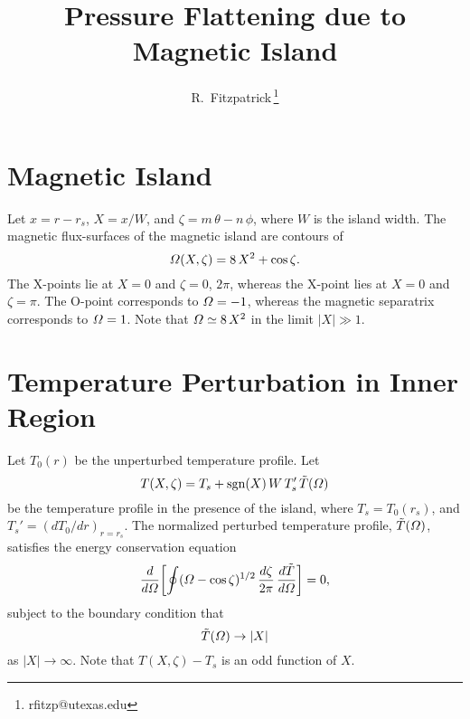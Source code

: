 \documentclass[12pt,prb,aps,notitlepage]{revtex4-1}
\begin{document}
\title{Pressure Flattening due to Magnetic Island}
\author{R.~Fitzpatrick\,\footnote{rfitzp@utexas.edu}}
\begin{abstract}
\end{abstract}
\maketitle

\section{Magnetic Island}
Let $x=r-r_s$, $X=x/W$, and $\zeta= m\,\theta-n\,\phi$, where $W$ is the island width. The magnetic flux-surfaces of the magnetic island are contours of
\begin{equation}
{\mit\Omega}(X,\zeta) = 8\,X^2 + \cos\zeta.
\end{equation}
The X-points lie at $X=0$ and $\zeta = 0$, $2\pi$, whereas the X-point lies at
$X=0$ and $\zeta=\pi$. The O-point corresponds to ${\mit\Omega}=-1$, whereas the magnetic separatrix corresponds to ${\mit\Omega}=1$.  Note that ${\mit\Omega}\simeq
8\,X^2$ in the limit $|X|\gg 1$. 

\section{Temperature Perturbation in Inner Region}
Let $T_0(r)$ be the unperturbed temperature profile. Let 
\begin{equation}\label{e2}
T(X,\zeta) = T_s + {\rm sgn}(X)\,W\,T_s'\,\tilde{T}({\mit\Omega})
\end{equation}
 be the temperature profile in the presence of the island,
where $T_s=T_0(r_s)$, and  $T_s'=(dT_0/dr)_{r=r_s}$. 
The normalized perturbed temperature profile, $\tilde{T}({\mit\Omega})$,  satisfies the energy conservation equation
\begin{equation}\label{e3}
\frac{d}{d{\mit\Omega}}\!\left[\oint({\mit\Omega}-\cos\zeta)^{1/2}\,\frac{d\zeta}{2\pi}\,\frac{d\tilde{T}}{d
{\mit\Omega}} \right]= 0,
\end{equation}
subject to the boundary condition that
\begin{equation}\label{e4}
\tilde{T}({\mit\Omega}) \rightarrow |X|
\end{equation}
as $|X|\rightarrow\infty$. Note that $T(X,\zeta)-T_s$ is an odd function of $X$. 
\end{document}
